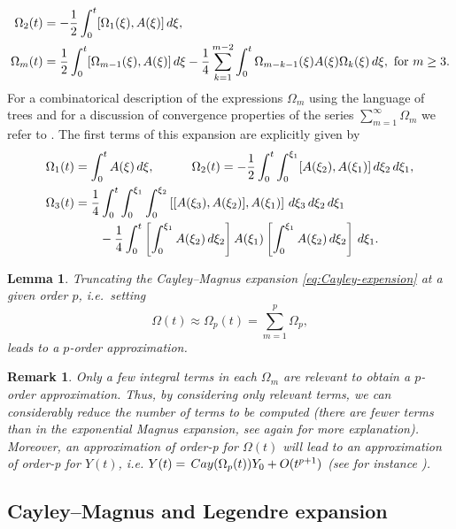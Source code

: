 \documentclass{article}
\newtheorem{lemma}{Lemma}[section]
\newtheorem{remark}{Remark}
\newcommand{\diff}{\,{\rm d}}
\newcommand{\Cay}{\,{\rm Cay}}
\newcommand{\Om}{\Omega}
\begin{document}
{\begin{equation*}
\begin{aligned}
\Om_2(t) &= - \frac{1}{2} \int_0^t [\Omega_1(\xi), A(\xi)] \diff \xi,\\
\Om_m(t) &= \frac{1}{2} \int_0^t [\Om_{m-1}(\xi), A(\xi)] \diff \xi - \frac{1}{4} \sum_{k=1}^{m-2} \int_0^t \Om_{m-k-1}(\xi)  A(\xi) \Om_k(\xi) \diff \xi, ~ \text{for} ~ m \geq 3.
\end{aligned}
\end{equation*}
%
For a combinatorical description of the expressions $\Omega_m$ using the language of trees and for a discussion of convergence properties of the series $\sum_{m=1}^\infty \Omega_m$ we refer to \cite{Iserles:2001}.
%
The first terms of this expansion are explicitly given by
%
\[
\begin{aligned}
\Om_1(t) &= \int_0^t A(\xi) \diff \xi, \quad \quad \quad 
\Om_2(t) = - \frac{1}{2} \int_0^t \int_0^{\xi_1} [A(\xi_2), A(\xi_1)] \diff \xi_2 \diff \xi_1,  \\
\Om_3(t) &= \frac{1}{4} \int_0^t \int_0^{\xi_1} \int_0^{\xi_2} \left[ [A(\xi_3), A(\xi_2)], A(\xi_1)\right] \diff \xi_3 \diff \xi_2 \diff \xi_1 \\
&\quad\quad - \frac{1}{4} \int_0^t \left[\int_0^{\xi_1} A(\xi_2) \diff \xi_2 \right] A(\xi_1) \left[\int_0^{\xi_1} A(\xi_2) \diff \xi_2 \right] \diff \xi_1.
\end{aligned}
\]
%

\begin{lemma}
Truncating the Cayley--Magnus expansion \eqref{eq:Cayley-expension} at a given order $p$, i.e.~setting
%
%
\begin{equation}
\label{eq:Cayley-truncate-expension}
\Om(t) \approx \Om_p(t) = \sum_{m=1}^{p} \Om_p,
\end{equation}
%
leads to a $p$-order approximation.
\end{lemma}

\begin{remark}
Only a few integral terms in each $\Om_m$ are relevant to obtain a $p$-order approximation. Thus, by considering only relevant terms, we can considerably reduce the number of terms to be computed (there are fewer terms than in the exponential Magnus expansion, see again \cite{Iserles:2001} for more explanation). Moreover, an approximation of order-p for $\Om(t)$ will lead to an approximation of order-p for $Y(t)$, i.e. $Y(t) = \Cay(\Om_p(t))Y_0 + O(t^{p+1})$ (see for instance \cite{DLP:1998}). 
\end{remark}


\subsection{Cayley--Magnus and Legendre expansion}

}
\end{document}
